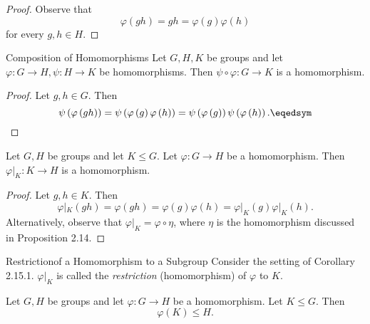 \documentclass[pmath347]{subfiles}
\begin{document}
    \begin{proof}
        Observe that
        \begin{equation*}
            \varphi\left( gh \right) = gh = \varphi\left( g \right) \varphi\left( h \right) 
        \end{equation*}
        for every $g,h\in H$.
    \end{proof}

    \begin{prop}{Composition of Homomorphisms}
        Let $G,H,K$ be groups and let $\varphi:G\to H, \psi:H\to K$ be homomorphisms. Then $\psi\circ\varphi:G\to K$ is a homomorphism.
    \end{prop}

    \begin{proof}
        Let $g,h\in G$. Then
        \begin{equation*}
            \psi\left( \varphi\left( gh \right)  \right) = \psi\left( \varphi\left( g \right) \varphi\left( h \right)  \right) = \psi\left( \varphi\left( g \right)  \right) \psi\left( \varphi\left( h \right)  \right) . \eqedsym
        \end{equation*}
    \end{proof}

    \begin{cor}{}
        Let $G,H$ be groups and let $K\leq G$. Let $\varphi:G\to H$ be a homomorphism. Then $\varphi|_K:K\to H$ is a homomorphism.
    \end{cor}	

    \begin{proof}
        Let $g,h\in K$. Then
        \begin{equation*}
            \varphi|_K\left( gh \right) = \varphi\left( gh \right) = \varphi\left( g \right) \varphi\left( h \right) = \varphi|_K\left( g \right) \varphi|_K\left( h \right) .
        \end{equation*}
        Alternatively, observe that $\varphi|_K = \varphi\circ\eta$, where $\eta$ is the homomorphism discussed in Proposition 2.14.
    \end{proof}
    
    \begin{definition}{Restriction}{of a Homomorphism to a Subgroup}
        Consider the setting of Corollary 2.15.1. $\varphi|_K$ is called the \emph{restriction} (homomorphism) of $\varphi$ to $K$.
    \end{definition}

    \begin{prop}{}
        Let $G,H$ be groups and let $\varphi:G\to H$ be a homomorphism. Let $K\leq G$. Then
        \begin{equation*}
            \varphi\left( K \right) \leq H.
        \end{equation*}
    \end{prop}
\end{document}
